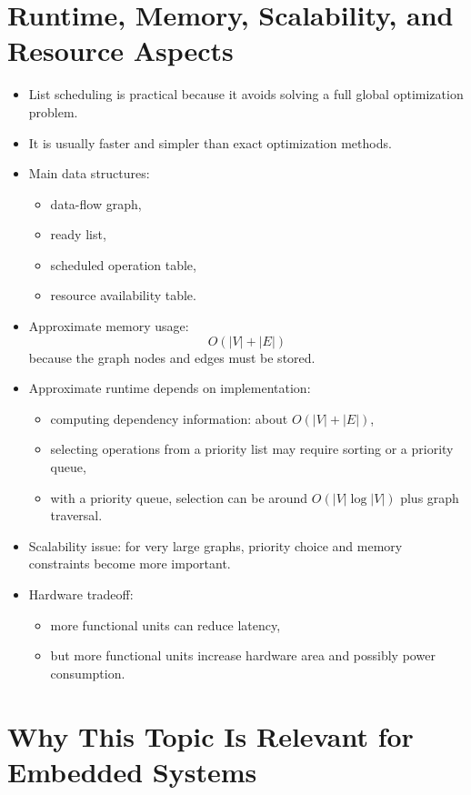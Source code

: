 \documentclass[11pt,a4paper]{article}
\begin{document}
\section{Runtime, Memory, Scalability, and Resource Aspects}

\begin{itemize}[leftmargin=*]
    \item List scheduling is practical because it avoids solving a full global optimization problem.
    \item It is usually faster and simpler than exact optimization methods.
    \item Main data structures:
    \begin{itemize}
        \item data-flow graph,
        \item ready list,
        \item scheduled operation table,
        \item resource availability table.
    \end{itemize}
    \item Approximate memory usage:
    \[
    O(|V|+|E|)
    \]
    because the graph nodes and edges must be stored.
    \item Approximate runtime depends on implementation:
    \begin{itemize}
        \item computing dependency information: about $O(|V|+|E|)$,
        \item selecting operations from a priority list may require sorting or a priority queue,
        \item with a priority queue, selection can be around $O(|V|\log |V|)$ plus graph traversal.
    \end{itemize}
    \item Scalability issue: for very large graphs, priority choice and memory constraints become more important.
    \item Hardware tradeoff:
    \begin{itemize}
        \item more functional units can reduce latency,
        \item but more functional units increase hardware area and possibly power consumption.
    \end{itemize}
\end{itemize}

\section{Why This Topic Is Relevant for Embedded Systems}
\end{document}
